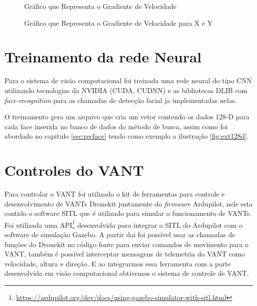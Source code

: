\begin{figure}[H]
	\centering
	\caption{Gráfico que Representa o Gradiente de Velocidade}
	
	\label{fig:teste8}
\end{figure}

\begin{figure}[H]
	\centering
	\caption{Gráfico que Representa o Gradiente de Velocidade para X e Y}
	
	\label{fig:teste9}
\end{figure}

\section{Treinamento da rede Neural}

Para o sistema de visão computacional foi treinada uma rede neural do tipo CNN utilizando tecnologias da NVIDIA (CUDA, CUDNN) e as bibliotecas DLIB com \textit{face-recognition} para as chamadas de detecção facial ja implementadas nelas.

O treinamento gera um arquivo que cria um vetor contendo os dados 128-D para cada face inserida no banco de dados do método de busca, assim como foi abordado no capitulo \ref{sec:recface} tendo como exemplo a ilustração \ref{fig:ext128d}.

\section{Controles do VANT}

Para controlar o VANT foi utilizado o kit de ferramentas para controle e desenvolvimento de VANTs Dronekit juntamente do \textit{firmware} Ardupilot, nele esta contido o software SITL que é utilizado para simular o funcionamento de VANTs. Foi utilizada uma API\footnote{\url{https://ardupilot.org/dev/docs/using-gazebo-simulator-with-sitl.html}} desenvolvida para integrar o SITL do Ardupilot com o software de simulação Gazebo.
A partir dai foi possível usar as chamadas de funções do Dronekit no código fonte para enviar comandos de movimento para o VANT, também é possível interceptar mensagens de telemetria do VANT como velocidade, altura e direção. E ao integrarmos essa ferramenta com a parte desenvolvida em visão computacional obtivemos o sistema de controle de VANT.


